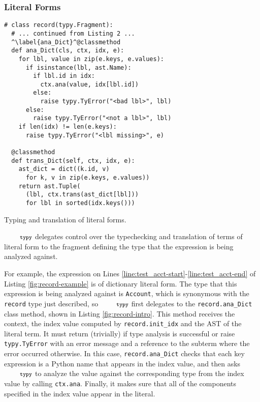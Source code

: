 \documentclass[10pt]{sigplanconf}
\newcommand{\typy}{\texttt{\footnotesize typy}}
\newcommand{\lip}[1]{\lstinline[language=Python,basicstyle=\ttfamily\footnotesize,morekeywords={with},deletendkeywords={tuple,buffer,map}]{#1}}
\newcommand{\li}[1]{\lip{#1}}
\begin{document}

\subsubsection{Literal Forms}\label{sec:literals}
\begin{codelisting}[t]
\vspace{-3px}
\begin{lstlisting}
# class record(typy.Fragment): 
  # ... continued from Listing 2 ...
  ^\label{ana_Dict}^@classmethod
  def ana_Dict(cls, ctx, idx, e):
    for lbl, value in zip(e.keys, e.values):
      if isinstance(lbl, ast.Name):
        if lbl.id in idx: 
          ctx.ana(value, idx[lbl.id])
        else: 
          raise typy.TyError("<bad lbl>", lbl)
      else: 
        raise typy.TyError("<not a lbl>", lbl)
    if len(idx) != len(e.keys): 
      raise typy.TyError("<lbl missing>", e)

  @classmethod
  def trans_Dict(self, ctx, idx, e): 
    ast_dict = dict((k.id, v) 
      for k, v in zip(e.keys, e.values))
    return ast.Tuple(
      (lbl, ctx.trans(ast_dict[lbl]))
      for lbl in sorted(idx.keys()))
\end{lstlisting}
\caption{Typing and translation of literal forms.}
\label{fig:record-intro}
\end{codelisting}
$\typy$ delegates control over the typechecking and translation of terms of literal form to the fragment defining the type that the expression is being analyzed against. 

For example, the expression on Lines \ref{line:test_acct-start}-\ref{line:test_acct-end} of Listing \ref{fig:record-example} is of dictionary literal form. The type that this expression is being analyzed against is \li{Account}, which is synonymous with the \li{record} type just described, so $\typy$ first delegates to the \li{record.ana_Dict} class method, shown in Listing \ref{fig:record-intro}. This method receives the context, the index value computed by \li{record.init_idx} and the AST of the literal term. It must return (trivially) if type analysis is successful or raise \li{typy.TyError} with an error message and a reference to the subterm where the error occurred otherwise. In this case, \li{record.ana_Dict} checks that each key expression is a Python name that appears in the index value, and then asks $\typy$ to analyze the value against the corresponding type from the index value by calling \li{ctx.ana}. Finally, it makes sure that all of the components specified in the index value appear in the literal.
\end{document}
